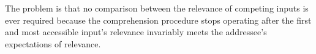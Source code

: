 %

The problem is that no comparison between the relevance of competing inputs is ever required because the comprehension procedure stops operating after the first and most accessible input's relevance invariably meets the addressee's expectations of relevance.

